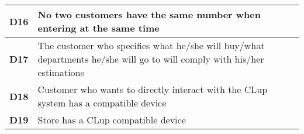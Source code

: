 \begin{center}
{\begin{tabular}{L{2cm}L{12cm}}
            \hline
            \textbf{D16} & No two customers have the same number when entering at the same time \\
            \hline
            \textbf{D17} & The customer who specifies what he/she will buy/what departments he/she will go to will comply with his/her estimations \\
            \hline
            \textbf{D18} & Customer who wants to directly interact with the CLup system has a compatible device \\
            \hline
            \textbf{D19} & Store has a CLup compatible device \\
            \hline
        \end{tabular}}
    \end{center}
